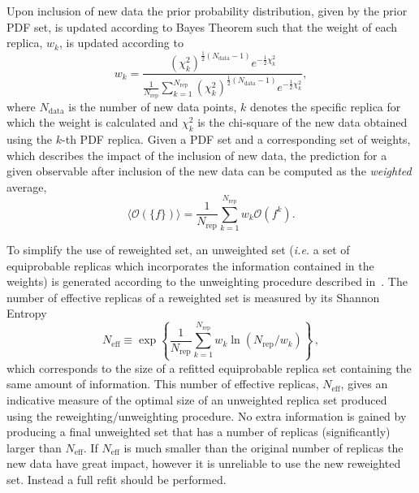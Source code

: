 Upon inclusion of new data the prior probability distribution, given by the prior PDF set, is updated according
to Bayes Theorem such that the weight of each replica, $w_k$, is updated according to
\begin{equation}
 w_k = \frac{(\chi^2_k)^{\frac{1}{2} (N_{\mathrm{data}}-1) } e^{-\frac{1}{2}\chi^2_k}}
          { \frac{1}{N_{\mathrm{rep}}} \sum^{N_{\mathrm{rep}}}_{k=1}(\chi^2_k)^{\frac{1}{2}(N_{\mathrm{data}}-1)} e^{-\frac{1}{2}\chi^2_k}  },
\end{equation}
where $N_{\mathrm{data}}$ is the number of new data points, $k$ denotes the specific replica for which the 
weight is calculated and $\chi^2_k$ is the chi-square of the new data obtained using the $k$-th PDF replica.
Given a PDF set and a corresponding set of weights, which describes the impact of the
inclusion of new data, the prediction for a given observable after inclusion of the new data can be computed as the {\em weighted} average,
\begin{equation}
\langle\mathcal{O}(\{f\})\rangle =  \frac{1}{N_{\mathrm{rep}}} \sum_{k=1}^{N_{\mathrm{rep}}} w_k \mathcal{O}(f^{k}).
\end{equation}

To simplify the use of reweighted set, an unweighted set ({\em i.e.} a set of equiprobable replicas which incorporates 
the information contained in the weights) is generated according to the unweighting procedure described in~\cite{Ball:2011gg}. 
The number of effective replicas of a reweighted set is measured by its Shannon 
Entropy~\cite{Ball:2010gb}
\begin{equation}
\label{eq:shannon}
N_\mathrm{eff}\equiv 
\exp\left\{\frac{1}{N_\mathrm{rep}}\sum_{k=1}^{N_\mathrm{rep}}w_k\ln(N_\mathrm{rep}/w_k)\right\}\,,
\end{equation}
which corresponds to the size of a refitted equiprobable replica set containing the same amount of information. 
This number of effective replicas, $N_\mathrm{eff}$, gives an indicative measure of the optimal size of an 
unweighted replica set produced using the reweighting/unweighting procedure. No extra information is 
gained by producing a final unweighted set that has a number of replicas (significantly) larger than 
$N_\mathrm{eff}$.  If $N_\mathrm{eff}$ is much smaller than the original number of replicas the new data have great impact, however it is unreliable to use the new reweighted set. Instead a full refit should be performed.

